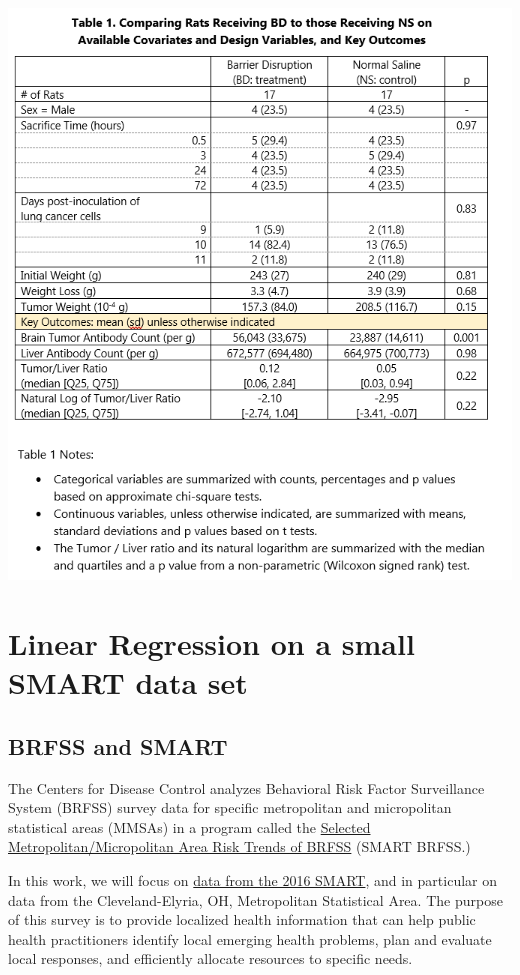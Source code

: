 \documentclass[]{book}
\theoremstyle{definition}
\theoremstyle{definition}
\theoremstyle{definition}
\theoremstyle{remark}
\begin{document}
\includegraphics[width=0.95\linewidth]{images/bb-table1inWord}

\chapter{Linear Regression on a small SMART data
set}\label{linear-regression-on-a-small-smart-data-set}

\section{BRFSS and SMART}\label{brfss-and-smart}

The Centers for Disease Control analyzes Behavioral Risk Factor
Surveillance System (BRFSS) survey data for specific metropolitan and
micropolitan statistical areas (MMSAs) in a program called the
\href{https://www.cdc.gov/brfss/smart/Smart_data.htm}{Selected
Metropolitan/Micropolitan Area Risk Trends of BRFSS} (SMART BRFSS.)

In this work, we will focus on
\href{https://www.cdc.gov/brfss/smart/smart_2016.html}{data from the
2016 SMART}, and in particular on data from the Cleveland-Elyria, OH,
Metropolitan Statistical Area. The purpose of this survey is to provide
localized health information that can help public health practitioners
identify local emerging health problems, plan and evaluate local
responses, and efficiently allocate resources to specific needs.
\end{document}
